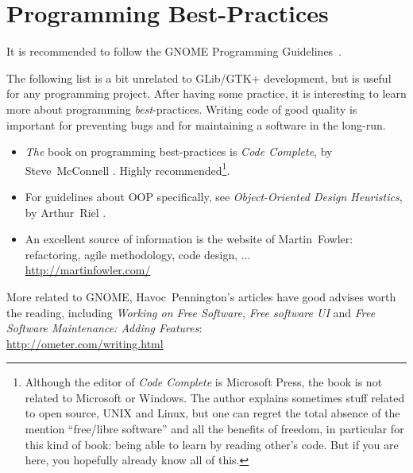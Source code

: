 \section{Programming Best-Practices}

It is recommended to follow the GNOME Programming Guidelines~\cite{gnome-programming-guidelines}.

The following list is a bit unrelated to GLib/GTK+ development, but is useful for any programming project. After having some practice, it is interesting to learn more about programming \emph{best}-practices. Writing code of good quality is important for preventing bugs and for maintaining a software in the long-run.

\begin{itemize}
  \item \emph{The} book on programming best-practices is \emph{Code Complete}, by Steve~McConnell \cite{code-complete}. Highly recommended\footnote{Although the editor of \emph{Code Complete} is Microsoft Press, the book is not related to Microsoft or Windows. The author explains sometimes stuff related to open source, UNIX and Linux, but one can regret the total absence of the mention ``free/libre software'' and all the benefits of freedom, in particular for this kind of book: being able to learn by reading other's code. But if you are here, you hopefully already know all of this.}.

  \item For guidelines about OOP specifically, see \emph{Object-Oriented Design Heuristics}, by Arthur~Riel \cite{oop-book}.

  \item An excellent source of information is the website of Martin~Fowler: refactoring, agile methodology, code design, ...\\
  \url{http://martinfowler.com/}
\end{itemize}

More related to GNOME, Havoc~Pennington's articles have good advises worth the reading, including \emph{Working on Free Software}, \emph{Free software UI} and \emph{Free Software Maintenance: Adding Features}:\\
\url{http://ometer.com/writing.html}
